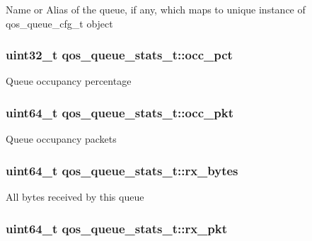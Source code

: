 Name or Alias of the queue, if any, which maps to unique instance of qos\-\_\-queue\-\_\-cfg\-\_\-t object \hypertarget{structqos__queue__stats__t_afd0bb346239a46de8f7803b7d7bf7ec7}{
\subsubsection[{occ\-\_\-pct}]{\setlength{\rightskip}{0pt plus 5cm}uint32\-\_\-t qos\-\_\-queue\-\_\-stats\-\_\-t\-::occ\-\_\-pct}}\label{structqos__queue__stats__t_afd0bb346239a46de8f7803b7d7bf7ec7}
Queue occupancy percentage \hypertarget{structqos__queue__stats__t_acda55406419650adc37794fe31f493b8}{
\subsubsection[{occ\-\_\-pkt}]{\setlength{\rightskip}{0pt plus 5cm}uint64\-\_\-t qos\-\_\-queue\-\_\-stats\-\_\-t\-::occ\-\_\-pkt}}\label{structqos__queue__stats__t_acda55406419650adc37794fe31f493b8}
Queue occupancy packets \hypertarget{structqos__queue__stats__t_a2a9787515b36cbc95cccb17ac22fd2eb}{
\subsubsection[{rx\-\_\-bytes}]{\setlength{\rightskip}{0pt plus 5cm}uint64\-\_\-t qos\-\_\-queue\-\_\-stats\-\_\-t\-::rx\-\_\-bytes}}\label{structqos__queue__stats__t_a2a9787515b36cbc95cccb17ac22fd2eb}
All bytes received by this queue \hypertarget{structqos__queue__stats__t_a5aaa1719313d242fbf106e09efd46d6c}{
\subsubsection[{rx\-\_\-pkt}]{\setlength{\rightskip}{0pt plus 5cm}uint64\-\_\-t qos\-\_\-queue\-\_\-stats\-\_\-t\-::rx\-\_\-pkt}}\label{structqos__queue__stats__t_a5aaa1719313d242fbf106e09efd46d6c}
